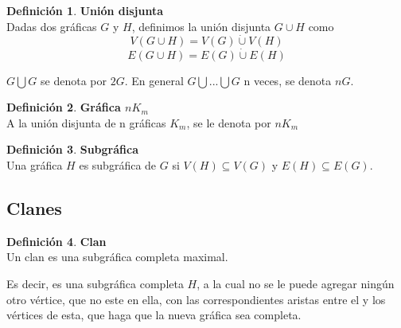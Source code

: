 \documentclass[11pt]{book}
\theoremstyle{definition}
\newtheorem{definition}{Definición}
\newcounter{in}
\newcounter{ini}
\begin{document}
\begin{definition}\textbf{Unión disjunta}\\
Dadas dos gráficas $G$ y $H$, definimos la unión disjunta $G\cup H$ como
$$V(G\cup H)=V(G)\dot{\cup}V(H)$$ $$E(G\cup H)=E(G)\dot{\cup}E(H)$$
\end{definition}

$G\bigcup G$ se denota por $2G$. En general $G\bigcup ...\bigcup G$
n veces, se denota $nG$. 



\begin{definition}\textbf{Gráfica $nK_m$}\\
A la unión disjunta de n gráficas $K_m$, se le denota por $nK_m$
\end{definition}


\begin{definition}\textbf{Subgráfica}\\
Una gráfica $H$ es subgráfica de $G$ si $V(H)\subseteq V(G)$ y
$E(H)\subseteq E(G)$.
\end{definition}


 

\subsection{Clanes}

\begin{definition}\textbf{Clan}\\
Un clan es una subgráfica completa maximal.
\end{definition}

Es decir, es una subgráfica completa $H$, a la cual no se le puede
agregar ningún otro vértice, que no este en ella, con las
correspondientes aristas entre el y los vértices de esta, que haga que
la nueva gráfica sea completa.
\end{document}
